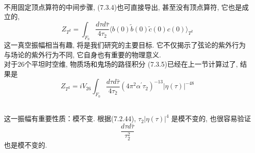 \\

不用固定顶点算符的中间步骤,  (7.3.4)也可直接导出, 甚至没有顶点算符, 它也是成立的, 
\begin{equation}
	Z_{T^{2}}=\int_{F_{0}} \frac{d \tau d \bar{\tau}}{4 \tau_{2}}\langle b(0) \tilde{b}(0) \tilde{c}(0) c(0)\rangle_{T^{2}}
\end{equation}
这一真空振幅相当有趣, 将是我们研究的主要目标. 它不仅揭示了弦论的紫外行为与场论的紫外行为不同, 它自身也有重要的物理意义.\\
对于26个平坦时空维, 物质场和鬼场的路径积分 (7.3.5)已经在上一节计算过了, 结果是
\begin{equation}
	Z_{T^{2}}=i V_{26} \int_{F_{0}} \frac{d \tau d \bar{\tau}}{4 \tau_{2}}\left(4 \pi^{2} \alpha^{\prime} \tau_{2}\right)^{-13}|\eta(\tau)|^{-48}
\end{equation}

\\

这一振幅有重要性质：模不变. 根据(7.2.44),  $\tau_{2}|\eta(\tau)|^{4}$ 是模不变的, 也很容易验证
\begin{equation}
	\frac{d \tau d \bar{\tau}}{\tau_{2}^{2}}
\end{equation}
也是模不变的.\\

\\

